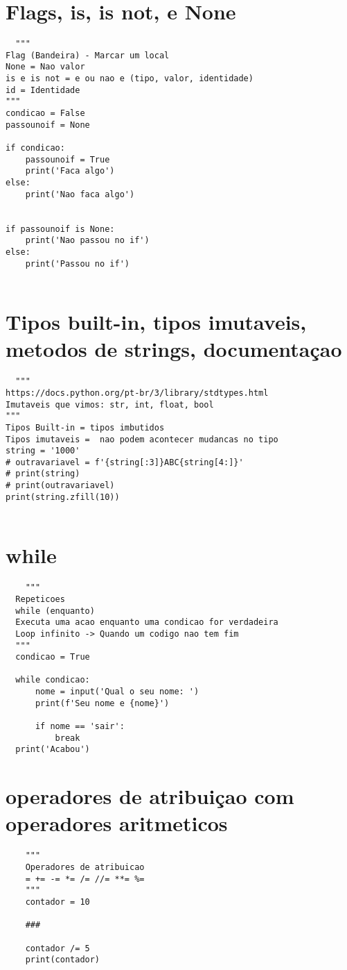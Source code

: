 \documentclass{article}
\begin{document}
\section{Flags, is, is not, e None}
\begin{lstlisting}
  """
Flag (Bandeira) - Marcar um local
None = Nao valor
is e is not = e ou nao e (tipo, valor, identidade)
id = Identidade
"""
condicao = False
passounoif = None

if condicao:
    passounoif = True
    print('Faca algo')
else:
    print('Nao faca algo')


if passounoif is None:
    print('Nao passou no if')
else:
    print('Passou no if')
  
\end{lstlisting}
\section{Tipos built-in, tipos imutaveis, metodos de strings, documentaçao}
\begin{lstlisting}
  """
https://docs.python.org/pt-br/3/library/stdtypes.html
Imutaveis que vimos: str, int, float, bool
"""
Tipos Built-in = tipos imbutidos
Tipos imutaveis =  nao podem acontecer mudancas no tipo
string = '1000'
# outravariavel = f'{string[:3]}ABC{string[4:]}'
# print(string)
# print(outravariavel)
print(string.zfill(10))
  
\end{lstlisting}
\section{while}
  \begin{lstlisting}
    """
  Repeticoes
  while (enquanto)
  Executa uma acao enquanto uma condicao for verdadeira
  Loop infinito -> Quando um codigo nao tem fim
  """
  condicao = True

  while condicao:
      nome = input('Qual o seu nome: ')
      print(f'Seu nome e {nome}')

      if nome == 'sair':
          break
  print('Acabou')
  \end{lstlisting}
\section{operadores de atribuiçao com operadores aritmeticos}
  \begin{lstlisting}
    """
    Operadores de atribuicao
    = += -= *= /= //= **= %=
    """
    contador = 10
    
    ###
    
    contador /= 5
    print(contador) 
  \end{lstlisting}
\end{document}
